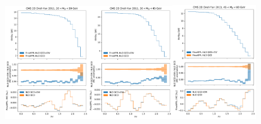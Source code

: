 \begin{figure}
    \centering
    \includegraphics[width=0.33\textwidth]{figures/pineappl_CMSDY2D11_bin1}\includegraphics[width=0.33\textwidth]{figures/pineappl_CMSDY2D11_bin2}\includegraphics[width=0.33\textwidth]{figures/pineappl_CMSDY2D11_bin3}

\end{figure}
